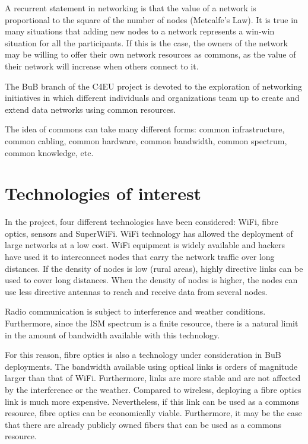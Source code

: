 \documentclass[conference]{IEEEtran}
\begin{document}
A recurrent statement in networking is that the value of a network is proportional to the square of the number of nodes (Metcalfe's Law).
It is true in many situations that adding new nodes to a network represents a win-win situation for all the participants.
If this is the case, the owners of the network may be willing to offer their own network resources as commons, as the value of their network will increase when others connect to it.

The BuB branch of the C4EU project is devoted to the exploration of networking initiatives in which different individuals and organizations team up to create and extend data networks using common resources.

The idea of commons can take many different forms: common infrastructure, common cabling, common hardware, common bandwidth, common spectrum, common knowledge, etc.

\section{Technologies of interest}
\label{sec:technologies}

In the project, four different technologies have been considered: WiFi, fibre optics, sensors and SuperWiFi.
WiFi technology has allowed the deployment of large networks at a low cost.
WiFi equipment is widely available and hackers have used it to interconnect nodes that carry the network traffic over long distances.
If the density of nodes is low (rural areas), highly directive links can be used to cover long distances.
When the density of nodes is higher, the nodes can use less directive antennas to reach and receive data from several nodes.

Radio communication is subject to interference and weather conditions.
Furthermore, since the ISM spectrum is a finite resource, there is a natural limit in the amount of bandwidth available with this technology.

For this reason, fibre optics is also a technology under consideration in BuB deployments.
The bandwidth available using optical links is orders of magnitude larger than that of WiFi.
Furthermore, links are more stable and are not affected by the interference or the weather.
Compared to wireless, deploying a fibre optics link is much more expensive.
Nevertheless, if this link can be used as a commons resource, fibre optics can be economically viable.
Furthermore, it may be the case that there are already publicly owned fibers that can be used as a commons resource.
\end{document}
